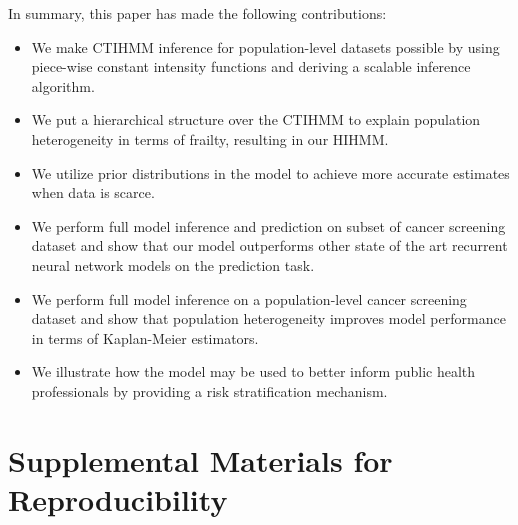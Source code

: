 \documentclass{article}
\begin{document}
In summary, this paper has made the following contributions:
\begin{itemize}
	\item We make CTIHMM inference for population-level datasets possible by using piece-wise constant intensity functions and deriving a scalable inference algorithm.
	\item We put a hierarchical structure over the CTIHMM to explain population heterogeneity in terms of frailty, resulting in our HIHMM.
	\item We utilize prior distributions in the model to achieve more accurate estimates when data is scarce.    
	\item We perform full model inference and prediction on subset of cancer screening dataset and show that our model outperforms other state of the art recurrent neural network models on the prediction task.
	\item We perform full model inference on a population-level cancer screening dataset and show that population heterogeneity improves model performance in terms of Kaplan-Meier estimators. 
	\item We illustrate how the model may be used to better inform public health professionals by providing a risk stratification mechanism. 
\end{itemize}


\newpage



\newpage
\section{Supplemental Materials for Reproducibility}
\end{document}
